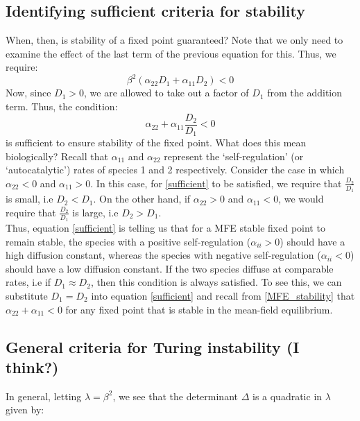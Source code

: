 \subsection{Identifying sufficient criteria for stability}


When, then, is stability of a fixed point guaranteed? Note that we only need to examine the effect of the last term of the previous equation for this. Thus, we require:
\begin{equation}
	\label{destabilizing_term}
	\beta^{2}(\alpha_{22}D_1 + \alpha_{11}D_2) < 0
\end{equation}
Now, since $D_1 > 0$, we are allowed to take out a factor of $D_1$ from the addition term. Thus, the condition:
\begin{equation}
	\label{sufficient}
	\alpha_{22} + \alpha_{11}\frac{D_2}{D_1} < 0
\end{equation}
is sufficient to ensure stability of the fixed point. What does this mean biologically? Recall that $\alpha_{11}$ and $\alpha_{22}$ represent the `self-regulation' (or `autocatalytic') rates of species 1 and 2 respectively. Consider the case in which $\alpha_{22} < 0$ and $\alpha_{11} > 0$. In this case, for \eqref{sufficient} to be satisfied, we require that $\frac{D_2}{D_1}$ is small, i.e $D_2 < D_1$. On the other hand, if $\alpha_{22} > 0$ and $\alpha_{11} < 0$, we would require that $\frac{D_2}{D_1}$ is large, i.e $D_2 > D_1$.\\
Thus, equation \eqref{sufficient} is telling us that for a MFE stable fixed point to remain stable, the species with a positive self-regulation ($\alpha_{ii} > 0$) should have a high diffusion constant, whereas the species with negative self-regulation ($\alpha_{ii} < 0$) should have a low diffusion constant. If the two species diffuse at comparable rates, i.e if $D_1 \approx D_2$, then this condition is always satisfied. To see this, we can substitute $D_1 = D_2$ into equation \eqref{sufficient} and recall from \eqref{MFE_stability} that $\alpha_{22} + \alpha_{11} < 0$ for any fixed point that is stable in the mean-field equilibrium.

\medskip

\subsection{General criteria for Turing instability (I think?)}

In general, letting $\lambda = \beta^2$, we see that the determinant $\Delta$ is a quadratic in $\lambda$ given by:

